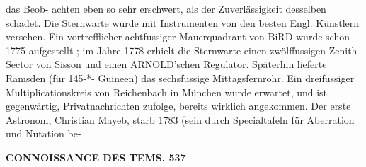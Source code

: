 \documentclass[12pt,a4paper]{article}
\begin{document}
 das  Beob- achten eben  so  sehr  erschwert,  als  der  Zuverlässigkeit  desselben  schadet.  Die  Sternwarte  wurde  mit Instrumenten  von  den  besten  Engl.  Künstlern  versehen.  Ein  vortrefflicher  achtfussiger  Mauerquadrant von  BiRD  wurde  schon  1775  aufgestellt ;  im  Jahre  1778  erhielt  die  Sternwarte  einen  zwölffussigen  Zenith- Sector  von  Sisson  und  einen  ARNOLD'schen  Regulator.  Späterhin  lieferte  Ramsden  (für  145-*-  Guineen) das  sechsfussige  Mittagsfernrohr.  Ein  dreifussiger  Multiplicationskreis  von  Reichenbach  in  München wurde  erwartet,  und  ist  gegenwärtig,  Privatnachrichten  zufolge,  bereits  wirklich  angekommen.  Der erste  Astronom,  Christian  Mayeb,  starb  1783  (sein  durch  Specialtafeln  für  Aberration  und  Nutation  be-

\vspace{0.5em}


\noindent\textbf{CONNOISSANCE  DES  TEMS.  537}
\end{document}
